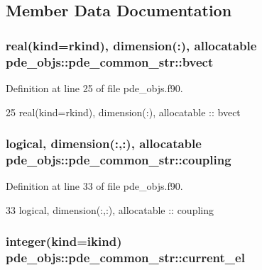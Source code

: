 \subsection{Member Data Documentation}
\subsubsection[{bvect}]{\setlength{\rightskip}{0pt plus 5cm}real(kind=rkind), dimension(\+:), allocatable pde\+\_\+objs\+::pde\+\_\+common\+\_\+str\+::bvect}\label{structpde__objs_1_1pde__common__str_a0959af029d205f1b4157faae194cde7a}


Definition at line 25 of file pde\+\_\+objs.\+f90.


\begin{DoxyCode}
25     \textcolor{keywordtype}{real(kind=rkind)}, \textcolor{keywordtype}{dimension(:)}, \textcolor{keywordtype}{allocatable} :: bvect
\end{DoxyCode}
\subsubsection[{coupling}]{\setlength{\rightskip}{0pt plus 5cm}logical, dimension(\+:,\+:), allocatable pde\+\_\+objs\+::pde\+\_\+common\+\_\+str\+::coupling}\label{structpde__objs_1_1pde__common__str_a68b6390e1b40b2d24099cfadb4b4b11c}


Definition at line 33 of file pde\+\_\+objs.\+f90.


\begin{DoxyCode}
33     \textcolor{keywordtype}{logical}, \textcolor{keywordtype}{dimension(:,:)}, \textcolor{keywordtype}{allocatable}             :: coupling
\end{DoxyCode}
\subsubsection[{current\+\_\+el}]{\setlength{\rightskip}{0pt plus 5cm}integer(kind=ikind) pde\+\_\+objs\+::pde\+\_\+common\+\_\+str\+::current\+\_\+el}\label{structpde__objs_1_1pde__common__str_a79aada1d8e437cf965cc0ce48d19a9c3}


